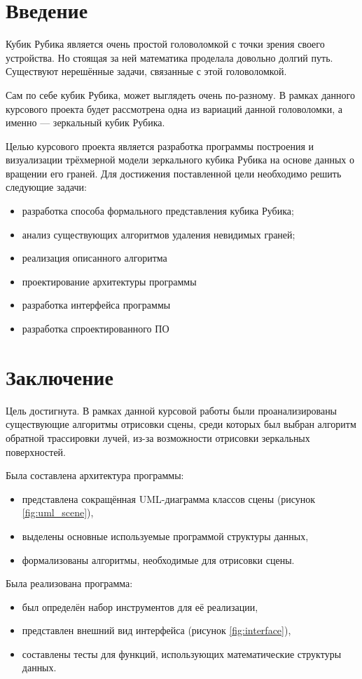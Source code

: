 


\tableofcontents
\section*{Введение}
Кубик Рубика является очень простой головоломкой с точки зрения своего устройства. Но стоящая за ней математика проделала довольно долгий путь. Существуют нерешённые задачи, связанные с этой головоломкой.

Сам по себе кубик Рубика, может выглядеть очень по-разному. В рамках данного курсового проекта будет рассмотрена одна из вариаций данной головоломки, а именно --- зеркальный кубик Рубика.

Целью курсового проекта является разработка программы построения и визуализации трёхмерной модели зеркального кубика Рубика на основе данных о вращении его граней. Для достижения поставленной цели необходимо решить следующие задачи:
\begin{itemize}
	\item разработка способа формального представления кубика Рубика;
	\item анализ существующих алгоритмов удаления невидимых граней;
	\item реализация описанного алгоритма
	\item проектирование архитектуры программы
	\item разработка интерфейса программы
	\item разработка спроектированного ПО
\end{itemize}






\section*{Заключение}
Цель достигнута. В рамках данной курсовой работы были проанализированы существующие алгоритмы отрисовки сцены, среди которых был выбран алгоритм обратной трассировки лучей, из-за возможности отрисовки зеркальных поверхностей.

Была составлена архитектура программы:
\begin{itemize}
	\item представлена сокращённая UML-диаграмма классов сцены (рисунок \ref{fig:uml_scene}),
	\item выделены основные используемые программой структуры данных,
	\item формализованы алгоритмы, необходимые для отрисовки сцены.
\end{itemize}

Была реализована программа:
\begin{itemize}
	\item был определён набор инструментов для её реализации,
	\item представлен внешний вид интерфейса (рисунок \ref{fig:interface}),
	\item составлены тесты для функций, использующих математические структуры данных.
\end{itemize}




